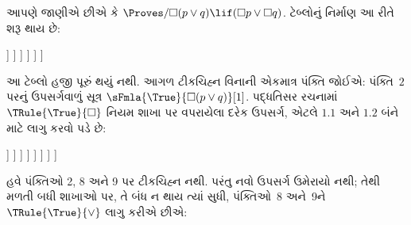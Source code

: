 \begin{ex}
  આપણે જાણીએ છીએ કે
  $\Proves/ \Box(p \lor q) \lif (\Box p \lor \Box q)$.
  ટેબ્લોનું નિર્માણ આ રીતે શરૂ થાય છે:
  \begin{oltableau}
    [\pFmla{\False}{\Box(p \lor q) \lif (\Box p \lor \Box q)}{1},
      just = \TAss, checked
      [\pFmla{\True}{\Box(p \lor q)}{1},
        just = {\TRule{\False}{\lif}[1]}, 
        [\pFmla{\False}{\Box p \lor \Box q}{1},
          just = {\TRule{\False}{\lif}[1]}, checked
          [\pFmla{\False}{\Box p}{1},
            just = {\TRule{\False}{\lor}[3]}, checked
            [\pFmla{\False}{\Box q}{1},
              just = {\TRule{\False}{\lor}[3]}, checked
              [\pFmla{\False}{p}{1.1}, 
                just = {\TRule{\False}{\Box}[4]}, checked
                [\pFmla{\False}{q}{1.2}, 
                  just = {\TRule{\False}{\Box}[5]}, checked
                ]
              ]
            ]
          ]
        ]
      ]
    ]
  \end{oltableau}
  આ ટેબ્લો હજી પૂરું થયું નથી. આગળ ટીકચિહ્ન વિનાની
  એકમાત્ર પંક્તિ જોઈએ: પંક્તિ~$2$ પરનું ઉપસર્ગવાળું
  સૂત્ર $\sFmla{\True}{\Box(p \lor q)}[1]$.
  પદ્ધતિસર રચનામાં $\TRule{\True}{\Box}$ નિયમ શાખા પર
  વપરાયેલા દરેક ઉપસર્ગ, એટલે $1.1$ અને $1.2$ બંને માટે
  લાગુ કરવો પડે છે:
  \begin{oltableau}
    [\pFmla{\False}{\Box(p \lor q) \lif (\Box p \lor \Box q)}{1},
      just = \TAss, checked
      [\pFmla{\True}{\Box(p \lor q)}{1},
        just = {\TRule{\False}{\lif}[1]}, 
        [\pFmla{\False}{\Box p \lor \Box q}{1},
          just = {\TRule{\False}{\lif}[1]}, checked
          [\pFmla{\False}{\Box p}{1},
            just = {\TRule{\False}{\lor}[3]}, checked
            [\pFmla{\False}{\Box q}{1},
              just = {\TRule{\False}{\lor}[3]}, checked
              [\pFmla{\False}{p}{1.1}, 
                just = {\TRule{\False}{\Box}[4]}, checked
                [\pFmla{\False}{q}{1.2}, 
                  just = {\TRule{\False}{\Box}[5]}, checked
                  [\pFmla{\True}{p \lor q}{1.1}, 
                    just = {\TRule{\True}{\Box}[2]}
                    [\pFmla{\True}{p \lor q}{1.2}, 
                      just = {\TRule{\True}{\Box}[2]}
                    ]
                  ]
                ]
              ]
            ]
          ]
        ]
      ]
    ]
  \end{oltableau}
  હવે પંક્તિઓ 2, 8 અને 9 પર ટીકચિહ્ન નથી. પરંતુ નવો
  ઉપસર્ગ ઉમેરાયો નથી; તેથી મળતી બધી શાખાઓ પર, તે બંધ ન
  થાય ત્યાં સુધી, પંક્તિઓ~8 અને~9ને
  $\TRule{\True}{\lor}$ લાગુ કરીએ છીએ:

\end{ex}
